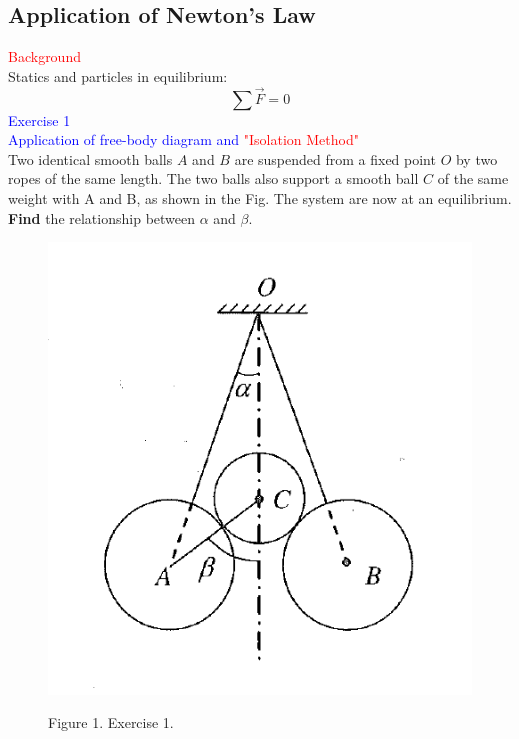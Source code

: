 \documentclass{beamer}
\begin{document}
\begin{frame}
\section{Application of Newton's Law}
\textcolor{red}{Background}\\
Statics and particles in equilibrium:\\
$$
  \sum{\vec{F}} = 0%
$$
\textcolor{blue}{Exercise 1}\\
\textcolor{blue}{\footnotesize{Application of free-body diagram and \textcolor{red}{"Isolation Method"}}}\\
Two identical smooth balls $A$ and $B$ are suspended from a fixed point $O$ by two ropes of the same length. The two balls also support a smooth ball $C$ of the same weight with A and B, as shown in the Fig. The system are now at an equilibrium. \textbf{Find} the relationship between $\alpha$ and $\beta$.
\end{frame}

\begin{frame}
  \begin{figure}[H]
    \centering
    \includegraphics[width=0.4 \linewidth, angle =0]{ex1.png}
    \begin{center}
      Figure 1. Exercise 1.
    \end{center}
    \label{fig:4}
    \end{figure}
\end{frame}
\end{document}
